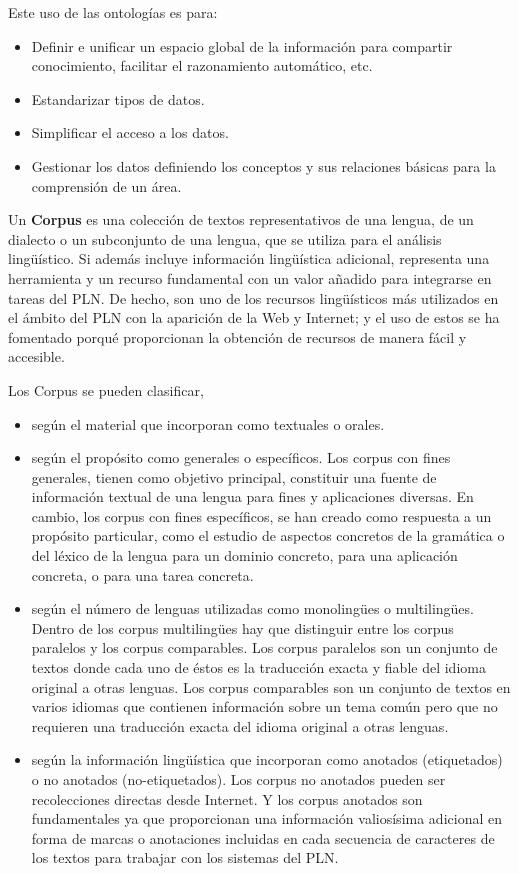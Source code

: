 \documentclass[11pt]{exam}
\begin{document}
\begin{questions}
Este uso de las ontologías es para:

\begin{itemize}
	\item Definir e unificar un espacio global de la información para compartir conocimiento, facilitar el razonamiento automático, etc.
	\item Estandarizar tipos de datos.
	\item Simplificar el acceso a los datos.
	\item Gestionar los datos definiendo los conceptos y sus relaciones básicas para la comprensión de un área.
\end{itemize}

Un {\bf Corpus} es una colección de textos representativos de una lengua, de un dialecto o un subconjunto de una lengua, que se utiliza para el análisis lingüístico. Si además incluye información lingüística adicional, representa una herramienta y un recurso fundamental con un valor añadido para integrarse en tareas del PLN. De hecho, son uno de los recursos lingüísticos más utilizados en el ámbito del PLN con la aparición de la Web y Internet; y el uso de estos se ha fomentado porqué proporcionan la obtención de recursos de manera fácil y accesible.

\newpage
Los Corpus se pueden clasificar,

\begin{itemize}
	\item según el material que incorporan como textuales o orales.
	\item según el propósito como generales o específicos.
		\subitem Los corpus con fines generales, tienen como objetivo principal, constituir una fuente de información textual de una lengua para fines y aplicaciones diversas.
		\subitem En cambio, los corpus con fines específicos, se han creado como respuesta a un propósito particular, como el
		estudio de aspectos	concretos de la gramática o	del léxico de la lengua para un	dominio concreto, para una aplicación concreta, o para una tarea concreta.
	\item según el número de lenguas utilizadas como monolingües o multilingües. Dentro de los corpus multilingües hay que distinguir entre los corpus paralelos y los corpus comparables.
		\subitem Los corpus paralelos son un conjunto de textos donde cada uno de éstos es la traducción exacta y fiable del idioma original a otras lenguas.
		\subitem Los corpus comparables son un conjunto de textos en varios idiomas que contienen información sobre un tema común pero que no requieren una traducción exacta del idioma original a otras lenguas.
	\item según la información lingüística que incorporan como anotados (etiquetados) o no anotados (no-etiquetados). Los corpus no anotados pueden ser recolecciones directas desde Internet. Y los corpus anotados son fundamentales ya que proporcionan una información valiosísima adicional en forma de marcas o anotaciones incluidas en cada secuencia de	caracteres de los textos para trabajar con los sistemas del PLN.
\end{itemize}


\end{questions}
\end{document}
